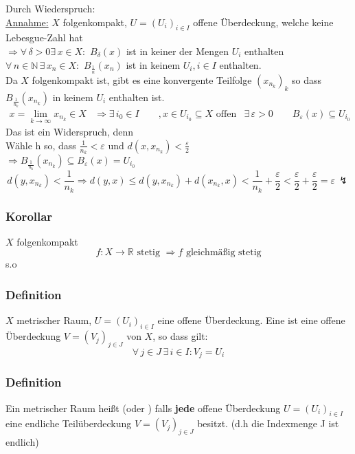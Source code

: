  
 Durch Wiederspruch: \\
 \underline{Annahme:} $X$ folgenkompakt, $U=(U_i)_{i \in I}$ offene Überdeckung, welche keine Lebesgue-Zahl hat \\
 $\Rightarrow \forall\, \delta >0 \exists\, x \in X:$ $B_{\delta}(x)$ ist in keiner der Mengen $U_i$ enthalten \\
 $\forall\, n \in \mathbb{N} \, \exists\, x_n \in X:$ $B_{\frac{1}{n}}(x_n)$ ist in keinem $U_i, i \in I$ enthalten. \\
 Da $X$ folgenkompakt ist, gibt es eine konvergente Teilfolge $(x_{n_k})_k$ so dass $B_{\frac{1}{n_k}}(x_{n_k})$ in keinem $U_i$ enthalten ist.
 \begin{align*}
 	x = \lim_{k \to \infty}x_{n_k} \in X & \Rightarrow \exists\,i_0 \in I \qquad ,x \in U_{i_0} \subseteq X \text{ offen}
	& \exists\,\varepsilon>0 \qquad B_{\varepsilon}(x) \subseteq U_{i_0}
 \end{align*}  
 Das ist ein Widerspruch, denn \\
 Wähle h so, dass $\frac{1}{n_k}< \varepsilon$ und $d(x,x_{n_k}) < \frac{\varepsilon}{2}$ \\
 $\Rightarrow B_{\frac{1}{n_k}}(x_{n_k}) \subseteq B_{\varepsilon}(x)=U_{i_0}$
 \[
 	d(y,x_{n_k})<\frac{1}{n_k} \Rightarrow d(y,x) \leq d(y,x_{n_k})+d(x_{n_k},x) < \frac{1}{n_k}+\frac{\varepsilon}{2} < \frac{\varepsilon}{2}+ \frac{\varepsilon}{2} = \varepsilon \,  \lightning
 \] 
 \bewende
 
 \subsubsection{Korollar} %
 \label{ssub:korollar}
 $X$ folgenkompakt
 \[
 	f:X \to \mathbb{R} \text{ stetig } \Rightarrow f \text{ gleichmäßig stetig} 
 \]
  s.o
 
\subsubsection{Definition} %
\label{ssub:definition}
$X$ metrischer Raum, $U=(U_i)_{i \in I}$ eine offene Überdeckung. Eine  ist eine offene Überdeckung $V=(V_j)_{j \in J}$ von $X$, so dass gilt: 
\[
	\forall\, j \in J \,\exists\,i \in I: V_j = U_i
\]
\subsubsection{Definition} %
\label{ssub:definition}
Ein metrischer Raum heißt  (oder ) falls { \bfseries jede} offene Überdeckung $U=(U_i)_{i \in I}$ eine endliche Teilüberdeckung $V=(V_j)_{j \in J}$ besitzt. (d.h die Indexmenge J ist endlich)
